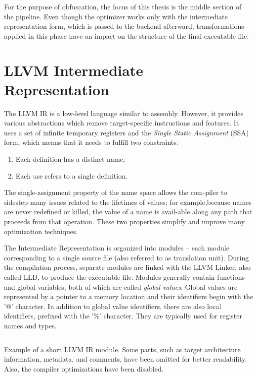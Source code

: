 \documentclass[
  digital, %
  notable,   %
  twoside, %
  nolof,     %
  nolot,     %
]{fithesis3}
\theoremstyle{definition}
\begin{document}
For the purpose of obfuscation, the focus of this thesis is the middle section of the pipeline. Even though the optimizer works only with the intermediate representation form, which is passed to the backend afterward, transformations applied in this phase have an impact on the structure of the final executable file. 

\section{LLVM Intermediate Representation}
The LLVM IR is a low-level language similar to assembly. However, it provides various abstractions which remove target-specific instructions and features. It uses a set of infinite temporary registers and the \textit{Single Static Assignment} (SSA) form, which means that it needs to fulfill two constraints:

\begin{enumerate}
    \item Each definition has a distinct name,
    \item Each use refers to a single definition.
\end{enumerate}

 The  single-assignment  property  of  the  name  space  allows  the  com-piler to sidestep many issues related to the lifetimes of values; for example,because names are never redefined or killed, the value of a name is avail-able along any path that proceeds from that operation. These two properties simplify and improve many optimization techniques\cite{eng_comp}.

The Intermediate Representation is organized into modules -- each module corresponding to a single source file (also referred to as translation unit). During the compilation process, separate modules are linked with the LLVM Linker, also called LLD, to produce the executable file. Modules generally contain functions and global variables, both of which are called \textit{global values}. Global values are represented by a pointer to a memory location and their identifiers begin with the '@' character. In addition to global value identifiers, there are also local identifiers, prefixed with the '\%' character. They are typically used for register names and types. 

\begin{listing}
    \inputminted{llvm}{example.ll}
    \caption{Example of a short LLVM IR module. Some parts, such as target architecture information, metadata, and comments, have been omitted for better readability. Also, the compiler optimizations have been disabled.}
    \label{fig:ir_example}
\end{listing}
\end{document}
